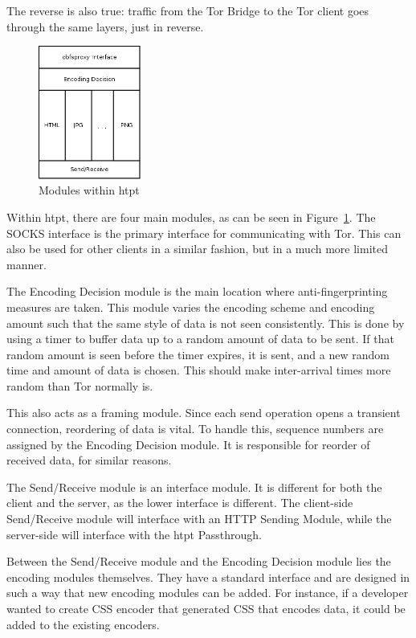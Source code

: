 The reverse is also true: traffic from the Tor Bridge to the Tor client goes through the same layers, just in reverse. 

\begin{figure}[h]
\centering
\includegraphics[width=0.3\textwidth]{htpt_architecture2}
\caption{Modules within htpt}
\label{fig:htpt_modules}
\end{figure}

Within htpt, there are four main modules, as can be seen in Figure~\ref{fig:htpt_modules}. The SOCKS interface is the primary interface for communicating with Tor. This can also be used for other clients in a similar fashion, but in a much more limited manner.

The Encoding Decision module is the main location where anti-fingerprinting measures are taken. This module varies the encoding scheme and encoding amount such that the same style of data is not seen consistently. This is done by using a timer to buffer data up to a random amount of data to be sent. If that random amount is seen before the timer expires, it is sent, and a new random time and amount of data is chosen. This should make inter-arrival times more random than Tor normally is. 

This also acts as a framing module. Since each send operation opens a transient connection, reordering of data is vital. To handle this, sequence numbers are assigned by the Encoding Decision module. It is responsible for reorder of received data, for similar reasons. 

The Send/Receive module is an interface module. It is different for both the client and the server, as the lower interface is different. The client-side Send/Receive module will interface with an HTTP Sending Module, while the server-side will interface with the htpt Passthrough.

Between the Send/Receive module and the Encoding Decision module lies the encoding modules themselves. They have a standard interface and are designed in such a way that new encoding modules can be added. For instance, if a developer wanted to create CSS encoder that generated CSS that encodes data, it could be added to the existing encoders.

